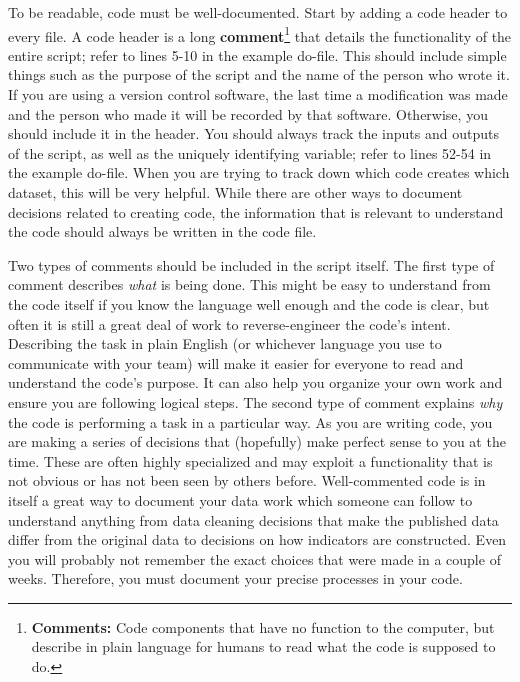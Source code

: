 \documentclass[
]{book}
\begin{document}
To be readable, code must be well-documented.
Start by adding a code header to every file.
A code header is a long \textbf{comment}\footnote{\textbf{Comments:} Code components that have no function to the computer,
  but describe in plain language for humans to read
  what the code is supposed to do.}
that details the functionality of the entire script;
refer to lines 5-10 in the example do-file.
This should include simple things such as
the purpose of the script and the name of the person who wrote it.
If you are using a version control software,
the last time a modification was made and the person who made it will be recorded by that software.
Otherwise, you should include it in the header.
You should always track the inputs and outputs of the script,
as well as the uniquely identifying variable;
refer to lines 52-54 in the example do-file.
When you are trying to track down which code creates which dataset, this will be very helpful.
While there are other ways to document decisions related to creating code,
the information that is relevant to understand the code should always be written in the code file.

Two types of comments should be included in the script itself.
The first type of comment describes \emph{what} is being done.
This might be easy to understand from the code itself
if you know the language well enough and the code is clear,
but often it is still a great deal of work to reverse-engineer the code's intent.
Describing the task in plain English (or whichever language you use to communicate with your team)
will make it easier for everyone to read and understand the code's purpose.
It can also help you organize your own work and ensure you are following logical steps.
The second type of comment explains \emph{why} the code is performing a task in a particular way.
As you are writing code, you are making a series of decisions that
(hopefully) make perfect sense to you at the time.
These are often highly specialized and may exploit a functionality
that is not obvious or has not been seen by others before.
Well-commented code is in itself a great way to document your data work
which someone can follow to understand anything from
data cleaning decisions that make the published data differ from the original data
to decisions on how indicators are constructed.
Even you will probably not remember the exact choices that were made in a couple of weeks.
Therefore, you must document your precise processes in your code.
\end{document}
